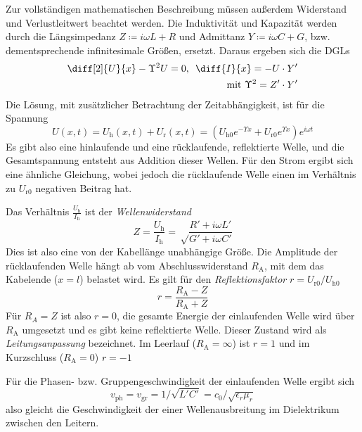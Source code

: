 \documentclass{article}
\newcommand{\defc}{black}
\newcommand{\colorT}[2][blue]{\color{#1}{#2}\color{\defc}}
\newcommand{\question}[1]{\colorT[purple]{\textbf{(#1)}}}
\newcommand{\todo}[1]{\colorT[red]{\textbf{(#1)}}}
\newcommand{\mr}{\mathrm}
\begin{document}
Zur vollständigen mathematischen Beschreibung müssen außerdem Widerstand und Verlustleitwert beachtet werden.
Die Induktivität und Kapazität werden durch die Längsimpedanz $Z \coloneq i\omega L + R$
und Admittanz $Y \coloneq i\omega C + G$, bzw. dementsprechende infinitesimale Größen, ersetzt.
Daraus ergeben sich die DGLs
\begin{align}
  \diff[2]{U}{x} - \Upsilon^2U = 0, \enspace \diff{I}{x} = -U\cdot Y'\\
  \text{mit } \Upsilon^2 = Z'\cdot Y' \nonumber
\end{align}
Die Lösung, mit zusätzlicher Betrachtung der Zeitabhängigkeit, ist für die Spannung
\begin{equation}
  U(x, t) = U_\mr h (x, t) + U_\mr r (x, t) = (U_{\mr h0} e^{-\Upsilon x} + U_{\mr r0} e^{\Upsilon x}) e^{i\omega t} 
\end{equation}
\todo{wo kommt $\omega$ her?}
Es gibt also eine hinlaufende und eine rücklaufende, reflektierte Welle, und die Gesamtspannung entsteht aus Addition dieser Wellen.
Für den Strom ergibt sich eine ähnliche Gleichung, wobei jedoch die rücklaufende Welle einen im Verhältnis zu $U_{\mr r0}$ negativen Beitrag hat.

Das Verhältnis $\frac{U_\mr h}{I_\mr h}$ ist der \textit{Wellenwiderstand}
\begin{equation}
  Z = \frac{U_\mr h}{I_\mr h} = \sqrt\frac{R' + i\omega L'}{G' + i\omega C'}
\end{equation}
Dies ist also eine von der Kabellänge unabhängige Größe.
Die Amplitude der rücklaufenden Welle hängt ab vom Abschlusswiderstand
$R_\mr A$, mit dem das Kabelende ($x = l$) belastet wird. Es gilt für den \textit{Reflektionsfaktor} $r = U_{\mr r0} / U_{\mr h0}$
\begin{equation}
  r = \frac{R_\mr A - Z}{R_\mr A + Z}
\end{equation}
Für $R_A = Z$ \question{ist RA dann komplex?} ist also $r = 0$, die gesamte Energie der einlaufenden Welle wird über $R_\mr A$ umgesetzt
und es gibt keine reflektierte Welle. Dieser Zustand wird als \textit{Leitungsanpassung} bezeichnet. Im Leerlauf ($R_\mr A = \infty$)
ist $r=1$ und im Kurzschluss ($R_\mr A = 0$) $r=-1$

Für die Phasen- bzw. Gruppengeschwindigkeit der einlaufenden Welle ergibt sich
\begin{equation}
  v_\mr{ph} = v_\mr{gr} = 1/\sqrt{L'C'} = c_0/\sqrt{\epsilon_r \mu_r}
\end{equation}
also gleicht die Geschwindigkeit der einer Wellenausbreitung im Dielektrikum zwischen den Leitern.
\end{document}
